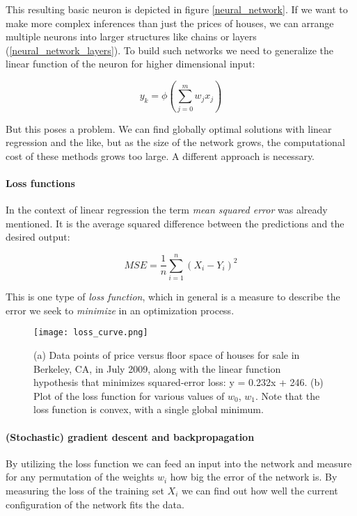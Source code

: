 This resulting basic neuron is depicted in figure \ref{neural_network}. If we want to make more complex inferences than just the prices of houses, we can arrange multiple neurons into larger structures like chains or layers (\ref{neural_network_layers}). To build such networks we need to generalize the linear function of the neuron for higher dimensional input:

$$
    y_k = \phi\left(\sum_{j=0}^{m}w_jx_j\right)
$$

But this poses a problem. We can find globally optimal solutions with linear regression and the like, but as the size of the network grows, the computational cost of these methods grows too large. A different approach is necessary.

\paragraph{Loss functions} In the context of linear regression the term \textit{mean squared error} was already mentioned. It is the average squared difference between the predictions and the desired output:

$$
    MSE = \frac{1}{n} \sum_{i = 1}^{n}(X_i - Y_i)^2
$$

This is one type of \textit{loss function}, which in general is a measure to describe the error we seek to \textit{minimize} in an optimization process.

\begin{figure}
    \centering
    \texttt{[image: loss\_curve.png]}
    \caption{(a) Data points of price versus floor space of houses for sale in Berkeley, CA, in July 2009, along with the linear function hypothesis that minimizes squared-error loss: y = 0.232x + 246. (b) Plot of the loss function for various values of $ w_0 $, $ w_1 $. Note that the loss function is convex, with a single global minimum. \cite[p. 1251]{russell_artificial_2021}}
    \label{loss_curve}
\end{figure}

\paragraph{(Stochastic) gradient descent and backpropagation} By utilizing the loss function we can feed an input into the network and measure for any permutation of the weights $ w_i $ how big the error of the network is. By measuring the loss of the training set $ X_i $ we can find out how well the current configuration of the network fits the data.

